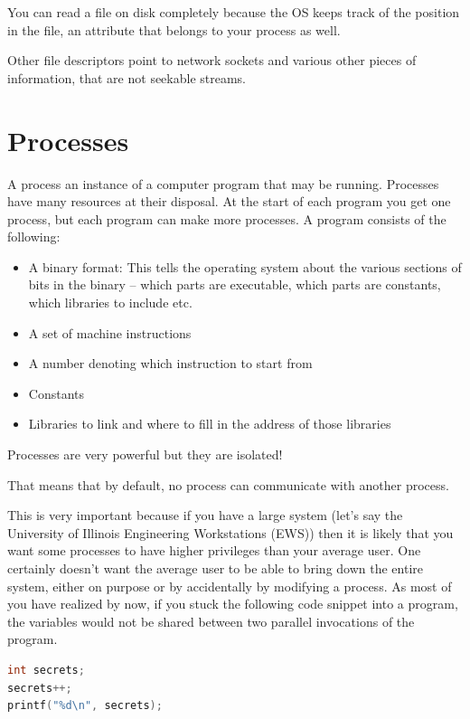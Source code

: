 You can read a file on disk completely because the OS keeps track of the position in the file, an attribute that belongs to your process as well.

Other file descriptors point to network sockets and various other pieces of information, that are not seekable streams.

\section{Processes}

A process an instance of a computer program that may be running.
Processes have many resources at their disposal.
At the start of each program you get one process, but each program can make more processes.
A program consists of the following:

\begin{itemize}
    \item A binary format: This tells the operating system about the various sections of bits in the binary -- which parts are executable, which parts are constants, which libraries to include etc.
    \item A set of machine instructions
    \item A number denoting which instruction to start from
    \item Constants
    \item Libraries to link and where to fill in the address of those libraries
\end{itemize}

Processes are very powerful but they are isolated!

That means that by default, no process can communicate with another process.

This is very important because if you have a large system (let's say the University of Illinois Engineering Workstations (EWS)) then it is likely that you want some processes to have higher privileges than your average user. One certainly doesn't want the average user to be able to bring down the entire system, either on purpose or by accidentally by modifying a process.
As most of you have realized by now, if you stuck the following code snippet into a program, the variables would not be shared between two parallel invocations of the program.

\begin{lstlisting}[language=C]
int secrets;
secrets++;
printf("%d\n", secrets);
\end{lstlisting}

